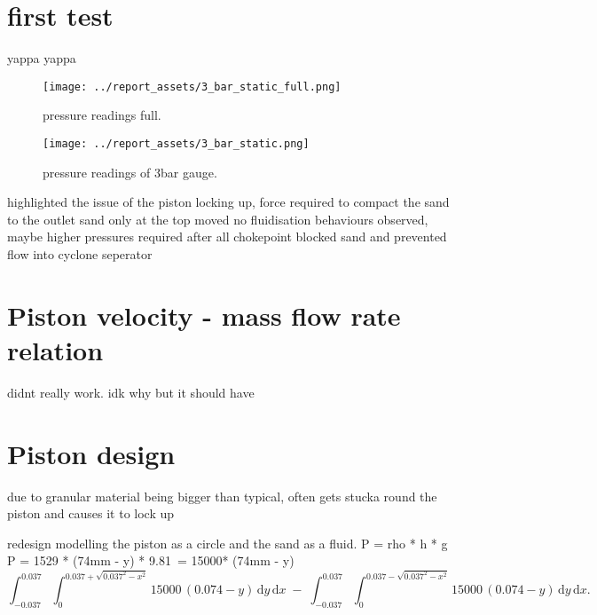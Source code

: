 \section{first test}
yappa yappa
\begin{figure}[htbp]
    \centering

    \begin{minipage}{0.45\textwidth}
        \centering
        \texttt{[image: ../report\_assets/3\_bar\_static\_full.png]}
        \caption{pressure readings full.}\label{fig:static-pres-drop-3bar_full}
    \end{minipage}
    \hfill
    \begin{minipage}{0.45\textwidth}
        \centering
        \texttt{[image: ../report\_assets/3\_bar\_static.png]}
        \caption{pressure readings of 3bar gauge.}\label{fig:static-pressurop-3bar}
    \end{minipage}

\end{figure}
highlighted the issue of the piston locking up,
force required to compact the sand to the outlet
sand only at the top moved
no fluidisation behaviours observed, maybe higher pressures required after all
chokepoint blocked sand and prevented flow into cyclone seperator
\section{Piston velocity - mass flow rate relation}
didnt really work. idk why but it should have
\section{Piston design}
due to granular material being bigger than typical, often gets stucka round the piston and causes it to lock up

redesign
modelling the piston as a circle and the sand as a fluid. 
P = rho * h * g
P = 1529 * (74mm - y) * 9.81~= 15000* (74mm - y)
\begin{equation}
    \int_{-0.037}^{0.037}\!\int_{0}^{0.037+\sqrt{0.037^2 - x^2}}15000\,(0.074 - y)\,\mathrm{d}y\,\mathrm{d}x
    \;-\;
    \int_{-0.037}^{0.037}\!\int_{0}^{0.037-\sqrt{0.037^2 - x^2}}15000\,(0.074 - y)\,\mathrm{d}y\,\mathrm{d}x.
\end{equation}

